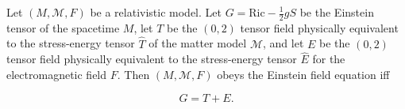 Let $(M, \mathcal{M}, F)$ be a relativistic model. Let $G = \text{Ric} - \frac{1}{2} g S$ be the Einstein tensor of the spacetime $M$, let $T$ be the $(0,2)$ tensor field physically equivalent to the stress-energy tensor $\hat{T}$ of the matter model $\mathcal{M}$, and let $E$ be the $(0,2)$ tensor field physically equivalent to the stress-energy tensor $\hat{E}$ for the electromagnetic field $F$. Then $(M, \mathcal{M}, F)$ obeys the Einstein field equation iff

$$G = T + E.$$
